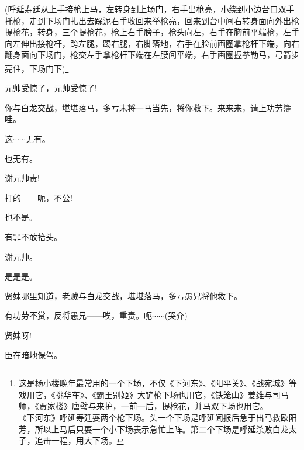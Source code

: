 {{(呼延寿廷{\hwfs 从上手接枪上马}，{\hwfs 左转身到上场门}，{\hwfs 右手出枪亮}，{\hwfs 小绕到小边台口双手托枪}，{\hwfs 走到下场门扎出去跺泥右手收回来举枪亮}，{\hwfs 回来到台中间右转身面向外出枪提枪花}，{\hwfs 转身}，{\hwfs 三个提枪花}，{\hwfs 枪上右手膀子}，{\hwfs 枪头向左}，{\hwfs 右手在胸前平端枪}，{\hwfs 左手向左伸出接枪杆}，{\hwfs 跨左腿}，{\hwfs 踢右腿}，{\hwfs 右脚落地}，{\hwfs 右手在脸前画圈拿枪杆下端}，{\hwfs 向右翻身面向下场门}，{\hwfs 枪交左手拿枪杆下端在左腰间平端}，{\hwfs 右手画圈握拳勒马}，{\hwfs 弓箭步亮住}，{\hwfs 下场门下})}\footnote{{\hei 这是杨小楼晚年最常用的一个下场}，不仅《下河东》、《阳平关》、《战宛城》等戏用它，《挑华车》、《霸王别姬》大铲枪下场也用它，《铁笼山》姜维与司马师，《贾家楼》唐璧与来护，一前一后，{\hwfs 提枪花}，{\hwfs 并马双下场}也用它。\\{\hei 《下河东》呼延寿廷耍两个枪下场。头一个下场是呼延闻报后急于出马救欧阳芳，所以上马后只耍一个小下场表示急忙上阵。第二个下场是呼延杀败白龙太子，追击一程，用大下场。}}

{\vspace{5pt}}

{元帅受惊了，元帅受惊了!}

{你与白龙交战，堪堪落马，多亏末将一马当先，将你救下。来来来，请上功劳簿{\footnotesize 哇}。}

{这$\cdots{}\cdots{}$无有。}

{也无有。}

{谢元帅责!}

{打的------呃，不公!}

{也不是。}

{有罪不敢抬头。}

{谢元帅。}

{是是是。}



{贤妹哪里知道，老贼与白龙交战，堪堪落马，多亏愚兄将他救下。}

{有功劳不赏，反将愚兄------唉，重责。呃$\cdots{}\cdots{}$({\hwfs 哭介})}

{贤妹呀!}


{\vspace{5pt}}

{臣在暗地保驾。}

}
